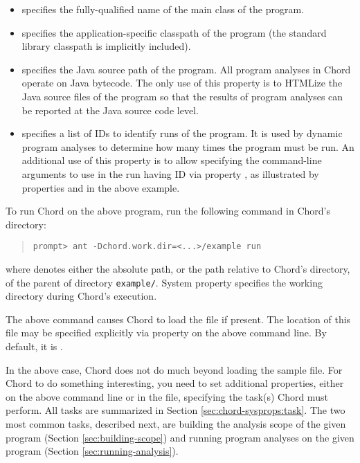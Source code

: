 \begin{itemize}
\item
{} specifies the fully-qualified name of the main class of the
program.
\item
{} specifies the application-specific classpath of the program
(the standard library classpath is implicitly included).
\item
{} specifies the Java source path of the program.
All program analyses in Chord operate on Java bytecode.
The only use of this property is to HTMLize the Java source files of the program so that the
results of program analyses can be reported at the Java source code level.
\item
{} specifies a list of IDs to identify runs of the program.
It is used by dynamic program analyses to determine how many times the program must be run.
An additional use of this property is to allow specifying the command-line arguments to use
in the run having ID  via property , as illustrated by
properties  and  in the above example.
\end{itemize}

To run Chord on the above program, run the following command in Chord's  directory:

\begin{quote}
\begin{verbatim}
prompt> ant -Dchord.work.dir=<...>/example run
\end{verbatim}
\end{quote}

\noindent where  denotes either the absolute path, or the path relative to Chord's  directory,
of the parent of directory {\tt example/}.
System property  specifies the working directory during Chord's execution.

The above command causes Chord to load the  file if present.
The location of this file may be specified explicitly via property
 on the above command line.
By default, it is .

In the above case, Chord does not do much beyond loading the sample  file.
For Chord to do something interesting, you need to set additional properties, either
on the above command line or in the  file, specifying the task(s)
Chord must perform.
All tasks are summarized in Section \ref{sec:chord-sysprops:task}.
The two most common tasks, described next, are building the analysis scope of the given program (Section \ref{sec:building-scope})
and running program analyses on the given program (Section \ref{sec:running-analysis}).

